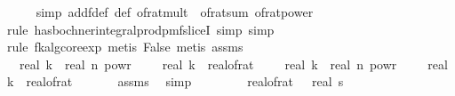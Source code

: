\begin{isabellebody}
\ \ \ \ \isamarkupfalse%
\ {\isacharparenleft}{\kern0pt}simp\ add{\isacharcolon}{\kern0pt}f{}{\isacharunderscore}{\kern0pt}def\ {\isasymOmega}{\isacharunderscore}{\kern0pt}def\ of{\isacharunderscore}{\kern0pt}rat{\isacharunderscore}{\kern0pt}mult\ \ of{\isacharunderscore}{\kern0pt}rat{\isacharunderscore}{\kern0pt}sum\ of{\isacharunderscore}{\kern0pt}rat{\isacharunderscore}{\kern0pt}power{\isacharparenright}{\kern0pt}\isanewline
\ \ \ \ \isamarkupfalse%
\ {\isacharparenleft}{\kern0pt}rule\ has{\isacharunderscore}{\kern0pt}bochner{\isacharunderscore}{\kern0pt}integral{\isacharunderscore}{\kern0pt}prod{\isacharunderscore}{\kern0pt}pmf{\isacharunderscore}{\kern0pt}sliceI{\isacharcomma}{\kern0pt}\ simp{\isacharcomma}{\kern0pt}\ simp{\isacharparenright}{\kern0pt}\isanewline
\ \ \ \ \isamarkupfalse%
\ {\isacharparenleft}{\kern0pt}rule\ fk{\isacharunderscore}{\kern0pt}alg{\isacharunderscore}{\kern0pt}core{\isacharunderscore}{\kern0pt}exp{\isacharcomma}{\kern0pt}\ metis\ False{\isacharcomma}{\kern0pt}\ metis\ assms{\isacharparenleft}{\kern0pt}{}{\isacharparenright}{\kern0pt}{\isacharparenright}{\kern0pt}\isanewline
\isanewline
\ \ \isamarkupfalse%
\ {\isachardoublequoteopen}{}\ {\isacharasterisk}{\kern0pt}\ real\ k\ {\isacharasterisk}{\kern0pt}\ real\ n\ powr\ {\isacharparenleft}{\kern0pt}{}\ {\isacharminus}{\kern0pt}\ {}\ {\isacharslash}{\kern0pt}\ real\ k{\isacharparenright}{\kern0pt}\ {\isacharequal}{\kern0pt}\ {\isacharparenleft}{\kern0pt}real{\isacharunderscore}{\kern0pt}of{\isacharunderscore}{\kern0pt}rat\ {\isasymdelta}{\isacharparenright}{\kern0pt}\ {\isacharasterisk}{\kern0pt}\ {\isacharparenleft}{\kern0pt}{}\ {\isacharasterisk}{\kern0pt}\ real\ k\ {\isacharasterisk}{\kern0pt}\ real\ n\ powr\ {\isacharparenleft}{\kern0pt}{}\ {\isacharminus}{\kern0pt}\ {}\ {\isacharslash}{\kern0pt}\ real\ k{\isacharparenright}{\kern0pt}\ {\isacharslash}{\kern0pt}\ {\isacharparenleft}{\kern0pt}real{\isacharunderscore}{\kern0pt}of{\isacharunderscore}{\kern0pt}rat\ {\isasymdelta}{\isacharparenright}{\kern0pt}\isanewline
\ \ \ \ \isamarkupfalse%
\ assms\ \isamarkupfalse%
\ simp\isanewline
\ \ \isamarkupfalse%
\ \isamarkupfalse%
\ {\isachardoublequoteopen}{\isachardot}{\kern0pt}{\isachardot}{\kern0pt}{\isachardot}{\kern0pt}\ {\isasymle}\ \ {\isacharparenleft}{\kern0pt}real{\isacharunderscore}{\kern0pt}of{\isacharunderscore}{\kern0pt}rat\ {\isasymdelta}{\isacharparenright}{\kern0pt}\ {\isacharasterisk}{\kern0pt}\ {\isacharparenleft}{\kern0pt}real\ s\isanewline

\end{isabellebody}
